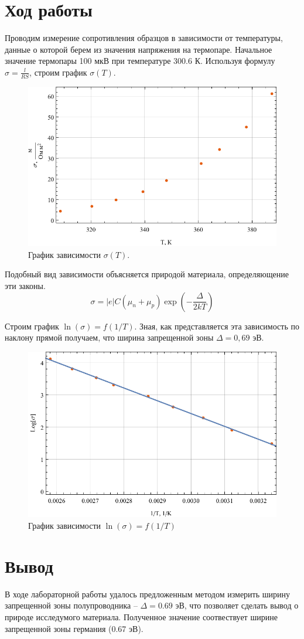 \documentclass[a4paper, 12pt]{article}
\begin{document}
	\section{Ход работы}
	Проводим измерение сопротивления образцов в зависимости от температуры, данные о которой берем из значения напряжения на термопаре. Начальное значение термопары 100 мкВ при температуре 300.6 К. Используя формулу $\sigma=\frac{l}{RS}$, строим график $\sigma(T)$.
	\begin{figure}[!htb]
		\centering
		\includegraphics[scale=1]{graph1.pdf}
		\caption{График зависимости $\sigma(T)$.}
	\end{figure}

	Подобный вид зависимости объясняется природой материала, определяющение эти законы.
	\begin{equation}
		\sigma=|e|C(\mu_n+\mu_p)\exp{\left(-\frac{\Delta}{2kT}\right)}
	\end{equation}

	Строим график $\ln(\sigma)=f(1/T)$. Зная, как представляется эта зависимость по наклону прямой получаем, что ширина запрещенной зоны $\Delta=0,69$ эВ. 
	\begin{figure}[!htb]
		\centering
		\includegraphics[scale=1]{graph2.pdf}
		\caption{График зависимости $\ln(\sigma)=f(1/T)$}
	\end{figure}

	\section{Вывод}
	В ходе лабораторной работы удалось предложенным методом измерить ширину запрещенной зоны полупроводника -- $\Delta=0.69$ эВ, что позволяет сделать вывод о природе исследумого материала. Полученное значение соотвествует ширине запрещенной зоны германия (0.67 эВ).
\end{document}
